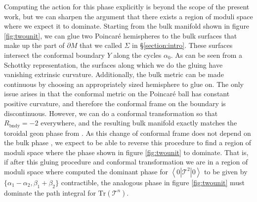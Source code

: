 \documentclass[letterpaper,12pt]{article}
\def\DM#1{{\color{red}{ [#1]}}}
\def\JW#1{{\color{LimeGreen}{ [#1]}}}
\newcommand{\corr}[1]{\left< #1\right>}
\newcommand{\Tr}{\text{Tr}}
\begin{document}
Computing the action for this phase explicitly is beyond the scope of the present work, but we can sharpen the argument that there exists a region of moduli space where we expect it to dominate. Starting from the bulk manifold shown in figure \ref{fig:twounit}, we can glue two Poincar\'e hemispheres to the bulk surfaces that make up the part of $\partial M$ that we called $\Sigma$ in \S\ref{section:intro}. These surfaces intersect the conformal boundary $Y$ along the cycles $\alpha_0$. As can be seen from a Schottky representation, the surfaces along which we do the gluing have vanishing extrinsic curvature. Additionally, the bulk metric can be made continuous by choosing an appropriately sized hemisphere to glue on. The only issue arises in that the conformal metric on the Poincar\'e ball has constant positive curvature, and therefore the conformal frame on the boundary is discontinuous. However, we can do a conformal transformation so that $R_\text{bndy} = -2$ everywhere, and the resulting bulk manifold exactly matches the toroidal geon phase from \cite{MRW}. As this change of conformal frame does not depend on the bulk phase \JW{Wait really? I feel like this is too good to be true. I must have missed something. Is this where the argument goes wrong?} \DM{Yes, and you will expand on this, right?}, we expect to be able to reverse this procedure to find a region of moduli space where the phase shown in figure \ref{fig:twounit} to dominate. That is, if after this gluing procedure and conformal transformation we are in a region of moduli space where \cite{MRW} computed the dominant phase for $\corr{0|\mathcal T^2 |0}$ to be given by $\{\alpha_1 -\alpha_2, \beta_1+\beta_2\}$ contractible, the analogous phase in figure \ref{fig:twounit} must dominate the path integral for $\Tr(\mathcal T^n)$.
\end{document}
